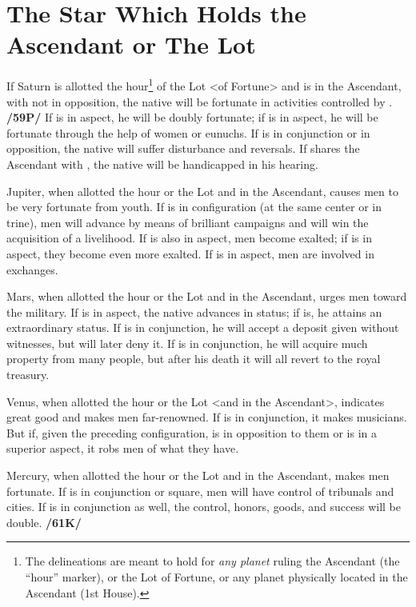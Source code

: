 \section{The Star Which Holds the Ascendant or The Lot}

If Saturn is allotted the hour\footnote{The delineations are meant to hold for \textit{any planet} ruling the Ascendant (the ``hour'' marker), or the Lot of Fortune, or any planet physically located in the Ascendant (1st House).} of the Lot <of Fortune> and is in the Ascendant, with \Mars\xspace not in opposition, the native will be fortunate in activities controlled by \Saturn. \textbf{/59P/} If \Jupiter\xspace is in aspect, he will be doubly fortunate; if \Venus\xspace is in aspect, he will be fortunate through the help of women or eunuchs. If \Mars\xspace is in conjunction or in opposition, the native will suffer disturbance and reversals. If \Mercury\xspace
shares the Ascendant with \Saturn, the native will be handicapped in his hearing.

Jupiter, when allotted the hour or the Lot and in the Ascendant, causes men to be very fortunate from youth. If \Mars\xspace is in configuration (at the same center or in trine), men will advance by means of brilliant campaigns and will win the acquisition of a livelihood. If \Saturn\xspace is also in aspect, men become exalted; if \Venus\xspace is in aspect, they become even more exalted. If \Mercury\xspace is in aspect, men are involved in exchanges.

Mars, when allotted the hour or the Lot and in the Ascendant, urges men toward the military. If \Jupiter\xspace is in aspect, the native advances in status; if \Venus\xspace is, he attains an extraordinary status. If \Mercury\xspace is in conjunction, he will accept a deposit given without witnesses, but will later deny it. If \Jupiter\xspace is in conjunction, he will acquire much property from many people, but after his death it will all revert to the royal treasury.

Venus, when allotted the hour or the Lot <and in the Ascendant>, indicates great good and makes men far-renowned. If \Mercury\xspace is in conjunction, it makes musicians. But if, given the preceding configuration, \Saturn\xspace is in opposition to them or is in a superior aspect, it robs men of what they have.

Mercury, when allotted the hour or the Lot and in the Ascendant, makes men fortunate. If \Jupiter\xspace is in
conjunction or square, men will have control of tribunals and cities. If \Saturn\xspace is in conjunction as well, the
control, honors, goods, and success will be double. \textbf{/61K/}

